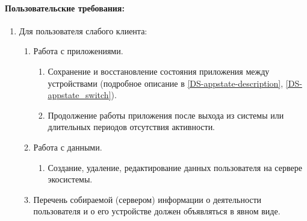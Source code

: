 \paragraph*{Пользовательские требования:}
\begin{enumerate}[label={\bfseries ПТ-\arabic*.}]
   \item Для пользователя слабого клиента:
         \begin{enumerate}[label*={\bfseries\arabic*.}]
            \item Работа с приложениями.
                  \begin{enumerate}[nosep,label*={\bfseries\arabic*.}]
                     \item Сохранение и восстановление состояния приложения между устройствами (подробное описание в \ref{DS-appstate-description}, \ref{DS-appstate_switch}).
                     \item Продолжение работы приложения после выхода из системы или длительных периодов отсутствия активности.
                  \end{enumerate}
            \item Работа с данными.
                  \begin{enumerate}[nosep,label*={\bfseries\arabic*.}]
                     \item Создание, удаление, редактирование данных пользователя на сервере экосистемы.
                  \end{enumerate}
            \item Перечень собираемой (сервером) информации о деятельности пользователя и о его устройстве должен объявляться в явном виде.
         \end{enumerate}


\end{enumerate}
